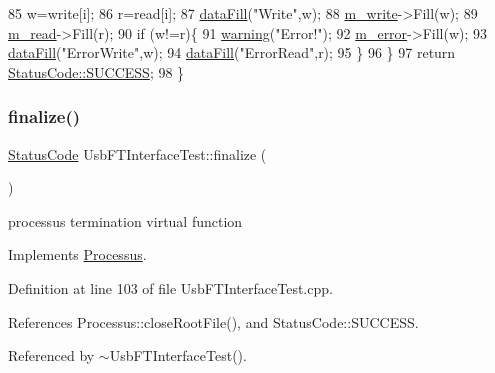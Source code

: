 \begin{DoxyCode}
85     w=write[i];
86     r=read[i];
87     \hyperlink{classProcessus_a0d093b48f3218a088ba030e24372f18c}{dataFill}(\textcolor{stringliteral}{"Write"},w);
88     \hyperlink{classUsbFTInterfaceTest_ab454b0a533694280200f10c97aa99f64}{m\_write}->Fill(w);
89     \hyperlink{classUsbFTInterfaceTest_a6bb9dcdfe857de2aebcb3e0c11c32167}{m\_read}->Fill(r);
90     \textcolor{keywordflow}{if} (w!=r)\{
91       \hyperlink{classObject_a65cd4fda577711660821fd2cd5a3b4c9}{warning}(\textcolor{stringliteral}{"Error!"});
92       \hyperlink{classUsbFTInterfaceTest_ac4efb68232e7acdf1b87278aabfbf1a6}{m\_error}->Fill(w);
93       \hyperlink{classProcessus_a0d093b48f3218a088ba030e24372f18c}{dataFill}(\textcolor{stringliteral}{"ErrorWrite"},w);
94       \hyperlink{classProcessus_a0d093b48f3218a088ba030e24372f18c}{dataFill}(\textcolor{stringliteral}{"ErrorRead"},r);
95     \}
96   \}
97   \textcolor{keywordflow}{return} \hyperlink{classStatusCode_a6f565cbeadc76d14c72f047e5e85eb4badd0da38d3ba0d922efd1f4619bc37ad8}{StatusCode::SUCCESS};
98 \}
\end{DoxyCode}
\mbox{\label{classUsbFTInterfaceTest_a652987fb86a0605842d9a8d7726b8012}} 
\subsubsection{\texorpdfstring{finalize()}{finalize()}}
{\footnotesize\ttfamily \hyperlink{classStatusCode}{Status\+Code} Usb\+F\+T\+Interface\+Test\+::finalize (\begin{DoxyParamCaption}{ }\end{DoxyParamCaption})\hspace{0.3cm}{\ttfamily [virtual]}}

processus termination virtual function 

Implements \hyperlink{classProcessus_aba93d691f031bdb18ae4b8afb1b2e856}{Processus}.



Definition at line 103 of file Usb\+F\+T\+Interface\+Test.\+cpp.



References Processus\+::close\+Root\+File(), and Status\+Code\+::\+S\+U\+C\+C\+E\+SS.



Referenced by $\sim$\+Usb\+F\+T\+Interface\+Test().


